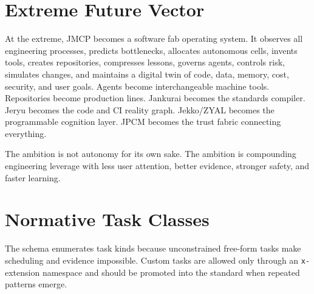\documentclass[10pt,journal,onecolumn]{IEEEtran}
\begin{document}
\section{Extreme Future Vector}
At the extreme, JMCP becomes a software fab operating system. It observes all engineering processes, predicts bottlenecks, allocates autonomous cells, invents tools, creates repositories, compresses lessons, governs agents, controls risk, simulates changes, and maintains a digital twin of code, data, memory, cost, security, and user goals. Agents become interchangeable machine tools. Repositories become production lines. Jankurai becomes the standards compiler. Jeryu becomes the code and CI reality graph. Jekko/ZYAL becomes the programmable cognition layer. JPCM becomes the trust fabric connecting everything.

The ambition is not autonomy for its own sake. The ambition is compounding engineering leverage with less user attention, better evidence, stronger safety, and faster learning.



\section{Normative Task Classes}
The schema enumerates task kinds because unconstrained free-form tasks make scheduling and evidence impossible. Custom tasks are allowed only through an \texttt{x-} extension namespace and should be promoted into the standard when repeated patterns emerge.
\end{document}

